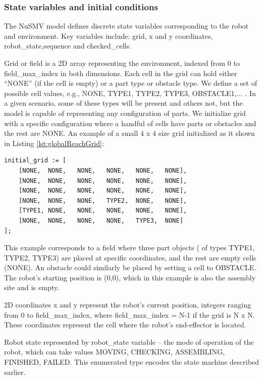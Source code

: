 \subsubsection{State variables and initial conditions}
The NuSMV model defines discrete state variables corresponding to the 
robot and environment. Key variables include: grid, x and y coordinates,
robot\_state,sequence and checked\_cells.

     Grid or field is a 2D array representing the environment, 
        indexed from 0 to field\_max\_index in 
        both dimensions. Each cell in the grid can hold either “NONE” (if the 
        cell is empty) or a part type or obstacle type. We define a set of 
        possible cell values, e.g., NONE, TYPE1, TYPE2, TYPE3, OBSTACLE1,... . 
        In a given scenario, some of these types will be present and others 
        not, but the model is capable of representing any configuration of 
        parts. We initialize grid with a specific configuration where a handful 
        of cells have parts or obstacles and the rest are NONE. 
        An example of a small 4 x 4 size grid initialized as it shown 
        in Listing \ref{lst:globalReachGrid}:

    \begin{lstlisting}[language=NuSMV, caption={Initial representation of grid in NuSMV model}, 
label={lst:globalReachGrid}]
    initial_grid := [
    [NONE,	NONE,	NONE,	NONE,	NONE,	NONE],		
    [NONE,	NONE,	NONE,	NONE,	NONE,	NONE],		
    [NONE,	NONE,	NONE,	NONE,	NONE,	NONE],		
    [NONE,	NONE,	NONE,	TYPE2,	NONE,	NONE],		
    [TYPE1,	NONE,	NONE,	NONE,	NONE,	NONE],		
    [NONE,	NONE,	NONE,	NONE,	TYPE3,	NONE]
];
    \end{lstlisting}

    This example corresponds to a field where three part objects (
    of types TYPE1, TYPE2, TYPE3) are placed at specific coordinates, 
    and the rest are empty cells (NONE). An obstacle could similarly be 
    placed by setting a cell to OBSTACLE. 
    The robot's starting position is (0,0), which in this example is also the 
    assembly site and is empty. 
    
    2D coordinates x and y represent the robot's current position, integers ranging from 
    0 to field\_max\_index, where field\_max\_index = N-1 if the grid is N x N. 
    These coordinates represent the cell where the robot’s end-effector is 
    located.

    Robot state represented by robot\_state variable -- the mode of 
    operation of the robot, which can take values
    MOVING, CHECKING, ASSEMBLING, FINISHED, FAILED. This enumerated type 
    encodes the state machine described earlier.

